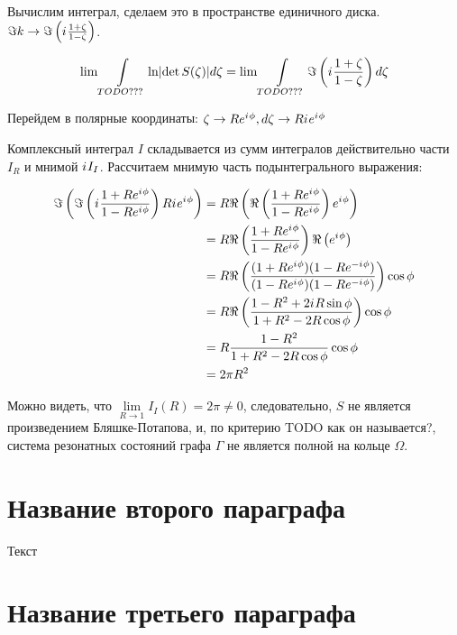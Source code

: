\documentclass{nsart_eng}
\DeclarePairedDelimiter{\abs}{\lvert}{\rvert}
\newcommand{\eexp}[1]{e^{#1}}
\newcommand{\iu}{{i\mkern1mu}}
\begin{document}
Вычислим интеграл, сделаем это в пространстве единичного диска. $\Im k \to \Im \left( \iu \frac{1 + \zeta}{1 - \zeta} \right) $.

\[
\lim \int\limits_{TODO ??? } \ln \abs{\det S(\zeta)} d \zeta = \lim \int\limits_{TODO ??? } \Im \left( \iu \frac{1 + \zeta}{1 - \zeta} \right)  d\zeta
\]

Перейдем в полярные координаты: $\zeta \to R \eexp{\iu \phi}, d\zeta \to R \iu \eexp{\iu \phi}$


Комплексный интеграл  $I$ складывается из сумм интегралов действительно части $I_R$ и мнимой $\iu I_I$. Рассчитаем мнимую часть подынтегрального выражения:

\begin{align*}
\Im \left(  \Im \left( \iu \frac{1 + R \eexp{\iu \phi}}{1 - R \eexp{\iu \phi}} \right) R \iu \eexp{\iu \phi} \right)
 &= R \Re \left(  \Re \left( \frac{1 + R \eexp{\iu \phi}}{1 - R \eexp{\iu \phi}} \right) \eexp{\iu \phi} \right) \\
 &= R \Re \left( \frac{1 + R \eexp{\iu \phi}}{1 - R \eexp{\iu \phi}} \right) \Re \left(   \eexp{\iu \phi} \right) \\
 &= R \Re \left( \frac{(1 + R \eexp{\iu \phi}) (1 - R \eexp{-\iu \phi}) }{(1 - R \eexp{\iu \phi}) (1 - R \eexp{-\iu \phi})} \right) \cos \phi \\
 &= R \Re \left( \frac{1 - R^2 + 2 \iu R \sin \phi}{1 + R^2 - 2 R \cos \phi} \right) \cos \phi \\
 &= R \frac{1 - R^2}{1 + R^2 - 2 R \cos \phi} \cos \phi \\
 &= 2 \pi R^2
\end{align*}

Можно видеть, что $\lim\limits_{R \to 1} I_I(R) = 2 \pi \ne 0$, следовательно, $S$ не является произведением Бляшке-Потапова, и, по критерию TODO как он называется?, система резонатных состояний графа $\Gamma$ не является полной на кольце $\Omega$.





\section{Название второго параграфа}
Текст

\section{Название третьего параграфа}
\end{document}
